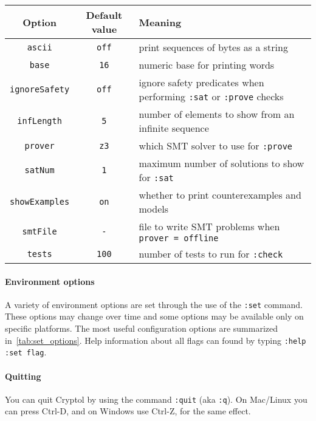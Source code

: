 
\begin{center}
  \begin{tabular*}{0.75\textwidth}[h]{c|c|l}
    \hline
     \textbf{Option}     & \textbf{Default value} & \textbf{Meaning}  \\
    \hline
     \texttt{ascii}           & \texttt{off}   & print sequences of bytes as a string \\
     \texttt{base}            & \texttt{16}    & numeric base for printing words  \\
     \texttt{ignoreSafety}   & \texttt{off}   & ignore safety predicates when performing \texttt{:sat} or \texttt{:prove} checks \\
     \texttt{infLength}       & \texttt{5}     & number of elements to show from an infinite sequence \\
     \texttt{prover}          & \texttt{z3}    & which SMT solver to use for \texttt{:prove}  \\
     \texttt{satNum}          & \texttt{1}     & maximum number of solutions to show for \texttt{:sat} \\
     \texttt{showExamples}   & \texttt{on}    & whether to print counterexamples and models \\
     \texttt{smtFile}         & \texttt{-}     & file to write SMT problems when \texttt{prover = offline} \\
     \texttt{tests}           & \texttt{100}   & number of tests to run for \texttt{:check} \\
    \hline
  \end{tabular*}
  \label{tab:set_options}
\end{center}
\paragraph*{Environment options}
A variety of environment options are set through the use of the
\texttt{:set} command.  These options may change over time and some
options may be available only on specific platforms.  The most useful
configuration options are summarized in~\autoref{tab:set_options}.
Help information about all flags can found by typing {\tt :help :set flag}.


\paragraph*{Quitting}
You can quit Cryptol by using the command {\tt :quit} (aka
\texttt{:q}).  On Mac/Linux you can press Ctrl-D, and on Windows use
Ctrl-Z, for the same effect.\indCmdQuit

